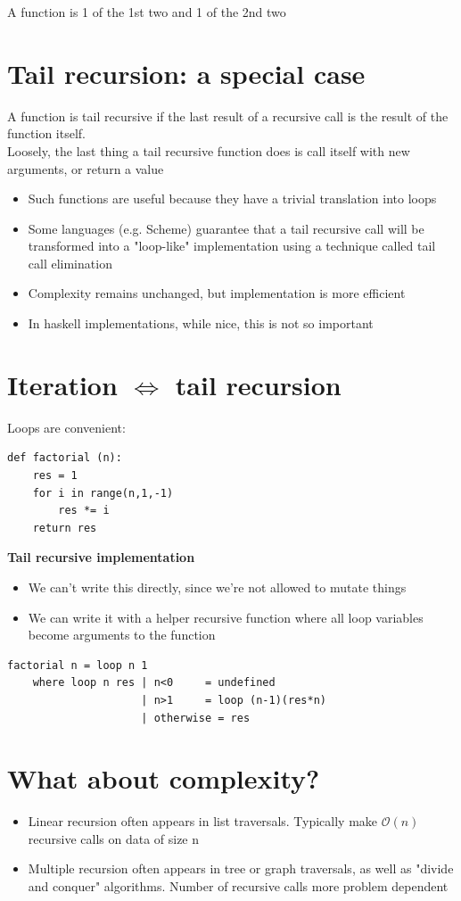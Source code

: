 \documentclass{article}[18pt]
\begin{document}
A function is 1 of the 1st two and 1 of the 2nd two
\section{Tail recursion: a special case}
\begin{defin}
A function is tail recursive if the last result of a recursive call is the result of the function itself.\\
Loosely, the last thing a tail recursive function does is call itself with new arguments, or return a value
\end{defin}
\begin{itemize}
	\item Such functions are useful because they have a trivial translation into loops
	\item Some languages (e.g. Scheme) guarantee that a tail recursive call will be transformed into a "loop-like" implementation using a technique called tail call elimination
	\item Complexity remains unchanged, but implementation is more efficient
	\item In haskell implementations, while nice, this is not so important
\end{itemize}
\section{Iteration $\Leftrightarrow$ tail recursion}
Loops are convenient:
\begin{verbatim}
def factorial (n):
	res = 1
	for i in range(n,1,-1)
		res *= i
	return res
\end{verbatim}
\textbf{Tail recursive implementation}
\begin{itemize}
	\item We can't write this directly, since we're not allowed to mutate things
	\item We can write it with a helper recursive function where all loop variables become arguments to the function
\end{itemize}
\begin{verbatim}
factorial n = loop n 1
	where loop n res | n<0	   = undefined
					 | n>1	   = loop (n-1)(res*n)
					 | otherwise = res
\end{verbatim}
\section{What about complexity?}
\begin{itemize}
	\item Linear recursion often appears in list traversals. Typically make $\mathcal{O}(n)$ recursive calls on data of size n
	\item Multiple recursion often appears in tree or graph traversals, as well as "divide and conquer" algorithms. Number of recursive calls more problem dependent
\end{itemize}
\end{document}
